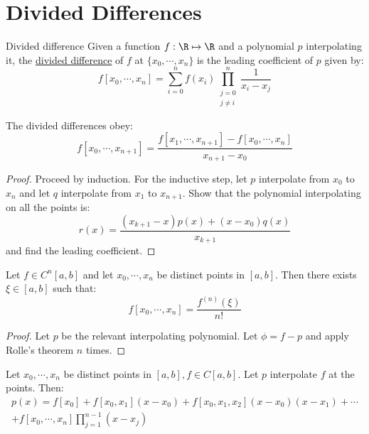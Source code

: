 \documentclass[../Main.tex]{subfiles}
\begin{document}
\section{Divided Differences}
\begin{definition}{Divided difference}
    Given a function $f : \R \mapsto \R$ and a polynomial $p$ interpolating it, the \underline{divided difference} of $f$ at $\{x_0, \cdots, x_n\}$ is the leading coefficient of $p$ given by:
    \begin{equation*}
        f[x_0, \cdots, x_n] = \sum_{i=0}^{n} f(x_i) \prod_{\substack{j=0\\j \neq i}}^{n} \frac{1}{x_i - x_j}
    \end{equation*}
\end{definition}
\begin{theorem}
    The divided differences obey:
    \begin{equation*}
        f[x_0, \cdots, x_{n+1}] = \frac{f[x_1, \cdots, x_{n+1}] - f[x_0, \cdots, x_n]}{x_{n+1} - x_0}
    \end{equation*}
    \label{thmDividedDifferences}
\end{theorem}
\begin{proof}
    Proceed by induction. For the inductive step, let $p$ interpolate from $x_0$ to $x_n$ and let $q$ interpolate from $x_1$ to $x_{n+1}$. Show that the polynomial interpolating on all the points is:
    \begin{equation*}
        r(x) = \frac{(x_{k+1} - x)p(x) + (x - x_0)q(x)}{x_{k+1}}
    \end{equation*}
    and find the leading coefficient.
\end{proof}
\begin{theorem}
    Let $f \in C^n[a, b]$ and let $x_0, \cdots, x_n$ be distinct points in $[a, b]$. Then there exists $\xi \in [a,b]$ such that:
    \begin{equation*}
        f[x_0, \cdots, x_n] = \frac{f^{(n)}(\xi)}{n!}
    \end{equation*}
    \label{thmDividedDifferenceDerivative}
\end{theorem}
\begin{proof}
    Let $p$ be the relevant interpolating polynomial. Let $\phi = f - p$ and apply Rolle's theorem $n$ times.
\end{proof}
\begin{theorem}
    Let $x_0, \cdots, x_n$ be distinct points in $[a, b], f \in C[a, b]$. Let $p$ interpolate $f$ at the points. Then:
    \begin{equation}
        \begin{split}
            p(x) = f[x_0] + f[x_0, x_1](x - x_0) + f[x_0, x_1, x_2] (x - x_0)(x - x_1) + \cdots \\
            +f[x_0, \cdots, x_n] \prod_{j=1}^{n-1} (x - x_j)
        \end{split}
        \label{eqnNewtonInterp}
    \end{equation}
    \label{thmNewtonInterp}
\end{theorem}
\end{document}
